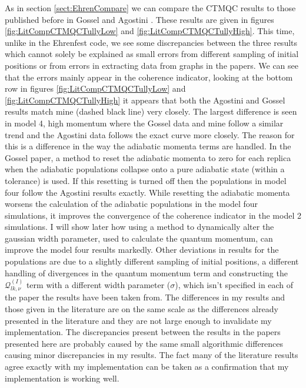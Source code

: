 As in section \ref{sect:EhrenCompare} we can compare the CTMQC results to those published before in Gossel \cite{gossel_coupled-trajectory_2018} and Agostini \cite{agostini_quantum-classical_2016}. These results are given in figures \ref{fig:LitCompCTMQCTullyLow} and \ref{fig:LitCompCTMQCTullyHigh}. This time, unlike in the Ehrenfest code, we see some discrepancies between the three results which cannot solely be explained as small errors from different sampling of initial positions or from errors in extracting data from graphs in the papers. We can see that the errors mainly appear in the coherence indicator, looking at the bottom row in figures \ref{fig:LitCompCTMQCTullyLow} and \ref{fig:LitCompCTMQCTullyHigh} it appears that both the Agostini and Gossel results match mine (dashed black line) very closely. The largest difference is seen in model 4, high momentum where the Gossel data and mine follow a similar trend and the Agostini data follows the exact curve more closely. The reason for this is a difference in the way the adiabatic momenta terms are handled. In the Gossel paper,  a method to reset the adiabatic momenta to zero for each replica when the adiabatic populations collapse onto a pure adiabatic state (within a tolerance) is used. If this resetting is turned off then the populations in model four follow the Agostini results exactly. While resetting the adiabatic momenta worsens the calculation of the adiabatic populations in the model four simulations, it improves the convergence of the coherence indicator in the model 2 simulations. I will show later how using a method to dynamically alter the gaussian width parameter, used to calculate the quantum momentum, can improve the model four results markedly. Other deviations in results for the populations are due to a slightly different sampling of initial positions, a different handling of divergences in the quantum momentum term and constructing the $\mathcal{Q}_{lk, \nu}^{(I)}$ term with a different width parameter ($\sigma$), which isn't specified in each of the paper the results have been taken from. The differences in my results and those given in the literature are on the same scale as the differences already presented in the literature and they are not large enough to invalidate my implementation. The discrepancies present between the results in the papers presented here are probably caused by the same small algorithmic differences causing minor discrepancies in my results. The fact many of the literature results agree exactly with my implementation can be taken as a confirmation that my implementation is working well. 

